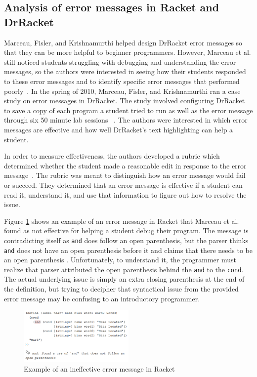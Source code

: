 \documentclass{sig-alternate}
\begin{document}
\subsection{Analysis of error messages in Racket and DrRacket}\label{subsec:racket analysis}
Marceau, Fisler, and Krishnamurthi helped design DrRacket error messages so that they can be more helpful to beginner programmers.
However, Marceau et al. still noticed students struggling with debugging and understanding the error messages, so the authors were interested in seeing how their students responded to these error messages and to identify specific error messages that performed poorly~\cite{Marceau:2011:MYL:2048237.2048241}.
In the spring of 2010, Marceau, Fisler, and Krishnamurthi ran a case study on error messages in DrRacket.
The study involved configuring DrRacket to save a copy of each program a student tried to run as well as the error message through six 50 minute lab sessions ~\cite{Marceau:2011:MEE:1953163.1953308}.
The authors were interested in which error messages are effective and how well DrRacket's text highlighting can help a student.  

In order to measure effectiveness, the authors developed a rubric which determined whether the student made a reasonable edit in response to the error message~\cite{Marceau:2011:MEE:1953163.1953308}.
The rubric was meant to distinguish how an error message would fail or succeed.
They determined that an error message is effective if a student can read it, understand it, and use that information to figure out how to resolve the issue.

Figure \ref{fig:racketerrormessage} shows an example of an error message in Racket that Marceau et al. found as not effective for helping a student debug their program.
The message is contradicting itself as \texttt{and} does follow an open parenthesis, but the parser thinks \texttt{and} does not have an open parenthesis before it and claims that there needs to be an open parenthesis .
Unfortunately, to understand it, the programmer must realize that parser attributed the open parenthesis behind the \texttt{and} to the \texttt{cond}.
The actual underlying issue is simply an extra closing parenthesis at the end of the definition, but trying to decipher that syntactical issue from the provided error message may be confusing to an introductory programmer.

\begin{figure}[t!]
  \centering
  \includegraphics[keepaspectratio, width=0.5\textwidth]{MEE_example.png}
  \caption{Example of an ineffective error message in Racket}
  \label{fig:racketerrormessage}
\end{figure}
\end{document}
